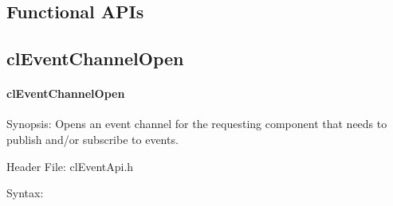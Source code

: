 \begin{flushleft}
\section{Functional APIs}
\subsection{clEventChannelOpen}
\hypertarget{pageem103}{}\paragraph{cl\-Event\-Channel\-Open}\label{pageem103}
\begin{Desc}
\item[Synopsis:]Opens an event channel for the requesting component that needs to publish and/or subscribe to events.\end{Desc}
\begin{Desc}
\item[Header File:]clEventApi.h\end{Desc}
\begin{Desc}
\item[Syntax:]


\end{Desc}
\end{flushleft}
